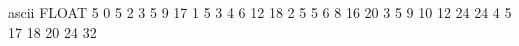 ascii
FLOAT
5
0
5
 2 3 5 9 17
1
5
 3 4 6 12 18
2
5
 5 6 8 16 20
3
5
 9 10 12 24 24
4
5
 17 18 20 24 32
